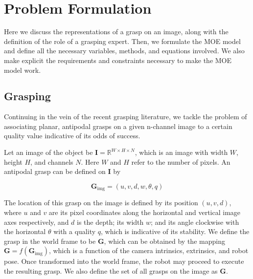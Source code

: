\documentclass[letterpaper, 10 pt, conference]{ieeeconf}
\begin{document}
\section{Problem Formulation}
\label{sec:problem_formulation}
Here we discuss the representations of a grasp on an image, along with the definition of the role of a grasping expert. Then, we formulate the MOE model and define all the necessary variables, methods, and equations involved.  We also make explicit the requirements and constraints necessary to make the MOE model work.

\subsection{Grasping}
\label{sec:grasp_formulation}


Continuing in the vein of the recent grasping literature, we tackle the problem of associating planar, antipodal grasps on a given n-channel image to a certain quality value indicative of its odds of success.

Let an image of the object be $\mathbf{I}=\mathbb{R}^{W \times H \times N}$, which is an image with width $W$, height $H$, and channels $N$. Here $W$ and $H$ refer to the number of pixels.  An antipodal grasp can be defined on $\mathbf{I}$ by

\begin{equation}
    \mathbf{G}_\mathrm{img}=(u, v, d, w, \theta, q)
\end{equation}

The location of this grasp on the image is defined by its position $(u, v, d)$, where $u$ and $v$ are its pixel coordinates along the horizontal and vertical image axes respectively, and $d$ is the depth; its width $w$; and its angle clockwise with the horizontal $\theta$ with a quality $q$, which is indicative of its stability.  We define the grasp in the world frame to be $\mathbf{G}$, which can be obtained by the mapping $\mathbf{G} = f(\mathbf{G}_\mathrm{img})$, which is a function of the camera intrinsics, extrinsics, and robot pose.  Once transformed into the world frame, the robot may proceed to execute the resulting grasp.  We also define the set of all grasps on the image as $\mathbf{G}$.
\end{document}
